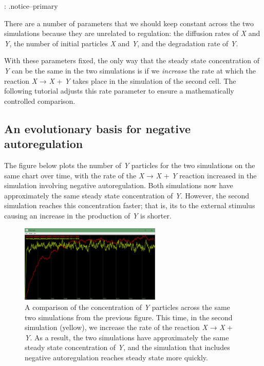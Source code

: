 \begin{qbox}\end{qbox} 
{: .notice--primary}

There are a number of parameters that we should keep constant across the two simulations because they are unrelated to regulation: the diffusion rates of \textit{X} and \textit{Y}, the number of initial particles \textit{X} and \textit{Y}, and the degradation rate of \textit{Y}.

With these parameters fixed, the only way that the steady state concentration of \textit{Y} can be the same in the two simulations is if we \textit{increase} the rate at which the reaction \textit{X} → \textit{X} + \textit{Y} takes place in the simulation of the second cell. The following tutorial adjusts this rate parameter to ensure a mathematically controlled comparison.


\FloatBarrier
{}
\subsection{An evolutionary basis for negative autoregulation}

The figure below plots the number of \textit{Y} particles for the two simulations on the same chart over time, with the rate of the \textit{X} → \textit{X} + \textit{Y} reaction increased in the simulation involving negative autoregulation. Both  simulations now have approximately the same steady state concentration of \textit{Y}. However, the second simulation reaches this concentration faster; that is, its  to the external stimulus causing an increase in the production of \textit{Y} is shorter.

\begin{figure}[h]
\centering
\mySfFamily
\includegraphics[width = 0.6\textwidth]{../assets/images/600px/nar_equal_chart.png}
\caption{A comparison of the concentration of \textit{Y} particles across the same two simulations from the previous figure. This time, in the second simulation (yellow), we increase the rate of the reaction \textit{X} → \textit{X} + \textit{Y}.  As a result, the two simulations have approximately the same steady state concentration of \textit{Y}, and the simulation that includes negative autoregulation reaches steady state more quickly.}
\label{fig:nar_equal_chart}
\end{figure}

